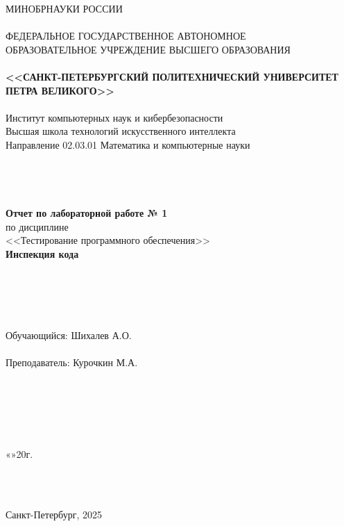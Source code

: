 \documentclass[11pt,a4paper,final]{article} %
\begin{document}
\thispagestyle{empty}

\begin{center}
	{\Large МИНОБРНАУКИ РОССИИ}\\
	~\\
	{\large ФЕДЕРАЛЬНОЕ ГОСУДАРСТВЕННОЕ АВТОНОМНОЕ \\ ОБРАЗОВАТЕЛЬНОЕ УЧРЕЖДЕНИЕ ВЫСШЕГО ОБРАЗОВАНИЯ}\\
	~\\
	{\Large \bf <<САНКТ-ПЕТЕРБУРГСКИЙ ПОЛИТЕХНИЧЕСКИЙ УНИВЕРСИТЕТ ПЕТРА ВЕЛИКОГО>>}\\
	~\\
	{\large Институт компьютерных наук и кибербезопасности }\\
	{\large Высшая школа технологий искусственного интеллекта}\\
	{\large Направление 02.03.01 Математика и компьютерные науки}\\
	~\\
	~\\
	~\\
	~\\
	{\Large \bf  Отчет по лабораторной работе № 1} \\
	{\Large по дисциплине} \\ {\Large <<Тестирование программного обеспечения>>}\\
	\vspace{3mm}
	{\Large \bf Инспекция кода}
	~\\
	~\\
	~\\
	~\\
	~\\
	~\\
	{\large Обучающийся: \underline{\hspace{3.5cm}} \hspace{12mm} Шихалев А.О.}\\
	~\\
	{\large Преподаватель: \underline{\hspace{3.5cm}} \hspace{12mm} Курочкин М.А.}\\
	~\\
	~\\
	~\\
	~\\
	~\\
\end{center}
\begin{flushright}
	
	«\underline{\hspace{1cm}}»\underline{\hspace{3cm}}20\underline{\hspace{0.7cm}}г.
\end{flushright}
~\\
~\\
\begin{center}
	{\large Санкт-Петербург, 2025}
\end{center}
\end{document}
